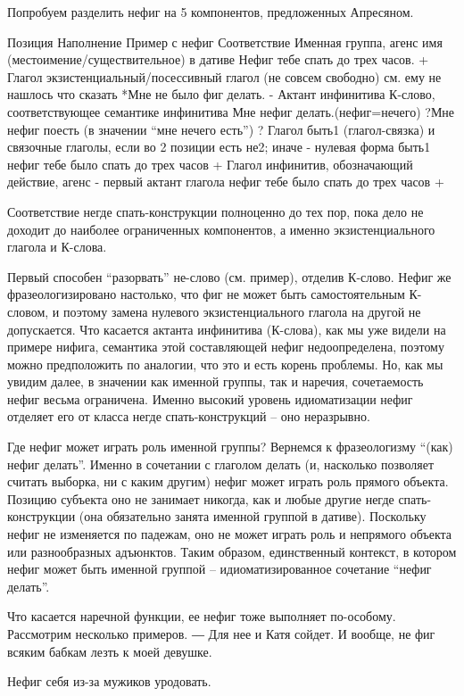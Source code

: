 \documentclass{article}
\begin{document}
Попробуем разделить нефиг на 5 компонентов, предложенных Апресяном.

Позиция
Наполнение
Пример с нефиг
Соответствие
Именная группа, агенс
имя (местоимение/существительное) в дативе
Нефиг тебе спать до трех часов.
+
Глагол
экзистенциальный/посессивный глагол (не совсем свободно)
см. ему не нашлось что сказать
*Мне не было фиг делать.
-
Актант инфинитива
К-слово, соответствующее семантике инфинитива
Мне нефиг делать.(нефиг=нечего)
?Мне нефиг поесть (в значении “мне нечего есть”)
?
Глагол
быть1 (глагол-связка) и связочные глаголы, если во 2 позиции есть не2; иначе - нулевая форма быть1
нефиг тебе было спать до трех часов
+
Глагол
инфинитив, обозначающий действие, агенс - первый актант глагола
нефиг тебе было спать до трех часов
+

Соответствие негде спать-конструкции полноценно до тех пор, пока дело не доходит до наиболее ограниченных компонентов, а именно экзистенциального глагола и К-слова. 

Первый способен “разорвать” не-слово (см. пример), отделив К-слово. Нефиг же фразеологизировано настолько, что фиг не может быть самостоятельным К-словом, и поэтому замена нулевого экзистенциального глагола на другой не допускается. Что касается актанта инфинитива (К-слова), как мы уже видели на примере нифига, семантика этой составляющей нефиг недоопределена, поэтому можно предположить по аналогии, что это и есть корень проблемы. Но, как мы увидим далее, в значении как именной группы, так и наречия, сочетаемость нефиг весьма ограничена. Именно высокий уровень идиоматизации нефиг отделяет его от класса негде спать-конструкций -- оно неразрывно.

Где нефиг может играть роль именной группы? Вернемся к фразеологизму “(как) нефиг делать”. Именно в сочетании с глаголом делать (и, насколько позволяет считать выборка, ни с каким другим) нефиг может играть роль прямого объекта. Позицию субъекта оно не занимает никогда, как и любые другие негде спать-конструкции (она обязательно занята именной группой в дативе). Поскольку нефиг не изменяется по падежам, оно не может играть роль и непрямого объекта или разнообразных адъюнктов. Таким образом, единственный контекст, в котором нефиг может быть именной группой -- идиоматизированное сочетание “нефиг делать”.

Что касается наречной функции, ее нефиг тоже выполняет по-особому. Рассмотрим несколько примеров.
 ― Для нее и Катя сойдет. И вообще, не фиг всяким бабкам лезть к моей девушке. 

Нефиг себя из-за мужиков уродовать.
\end{document}
